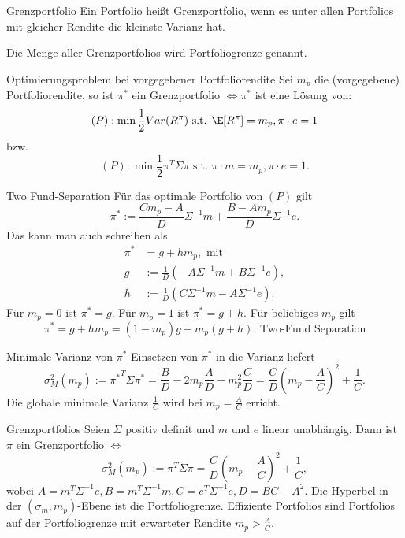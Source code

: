 \begin{karte}{Grenzportfolio}
Ein Portfolio heißt Grenzportfolio, wenn es unter allen Portfolios mit gleicher Rendite 
die kleinste Varianz hat. 

Die Menge aller Grenzportfolios wird Portfoliogrenze genannt.
\end{karte}

\begin{karte}{Optimierungsproblem bei vorgegebener Portfoliorendite}
Sei \(m_p\) die (vorgegebene) Portfoliorendite, so ist \(\pi^*\) ein Grenzportfolio 
\(\Leftrightarrow \pi^*\) ist eine Lösung von: 
\[ (P): \min \frac{1}{2} Var(R^\pi) \text{ s.t. } \E[R^\pi] = m_p, \pi \cdot e = 1 \]
bzw.
\[ (P): \min \frac{1}{2} \pi^T \Sigma \pi \text{ s.t. } \pi \cdot m = m_p, \pi \cdot e = 1. \]
\end{karte}

\begin{karte}{Two Fund-Separation}
Für das optimale Portfolio von \((P)\) gilt 
\[ \pi^* := \frac{C m_p - A}{D} \Sigma^{-1} m + \frac{B - A m_p}{D} \Sigma^{-1} e. \]
Das kann man auch schreiben als 
\begin{align*}
    \pi^* &= g + h m_p, \text{ mit } \\
    g &:= \frac{1}{D} (-A \Sigma^{-1} m + B \Sigma^{-1} e), \\
    h &:= \frac{1}{D} ( C \Sigma^{-1} m - A \Sigma^{-1}e).
\end{align*}
Für \(m_p = 0\) ist \(\pi^* = g\). Für \(m_p = 1\) ist \(\pi^* = g + h\). Für beliebiges \(m_p\) gilt 
\[ \pi^* = g+h m_p = (1-m_p) g + m_p (g+h). \text{ Two-Fund Separation} \]
\end{karte}

\begin{karte}{Minimale Varianz von \(\pi^*\)}
Einsetzen von \(\pi^*\) in die Varianz liefert 
\[ \sigma_M^2(m_p) := {\pi^*}^T\Sigma \pi^* = \frac{B}{D} - 2m_p \frac{A}{D} + m_p^2 \frac{C}{D} 
= \frac{C}{D} (m_p - \frac{A}{C})^2 + \frac{1}{C}. \]
Die globale minimale Varianz \(\frac{1}{C}\) wird bei \(m_p = \frac{A}{C}\) erricht.
\end{karte}

\begin{karte}{Grenzportfolios}
Seien \(\Sigma\) positiv definit und \(m\) und \(e\) linear unabhängig. Dann ist \(\pi\) 
ein Grenzportfolio \(\Leftrightarrow\)
\[ \sigma_M^2(m_p) := \pi^T \Sigma \pi = \frac{C}{D} (m_p - \frac{A}{C})^2 + \frac{1}{C}, \]
wobei \(A = m^T \Sigma^{-1} e, B = m^T \Sigma^{-1} m, C = e^T \Sigma^{-1} e, D = BC - A^2\). 
Die Hyperbel in der \((\sigma_m, m_p)\)-Ebene ist die Portfoliogrenze. Effiziente Portfolios 
sind Portfolios auf der Portfoliogrenze mit erwarteter Rendite \(m_p > \frac{A}{C}\).
\end{karte}

